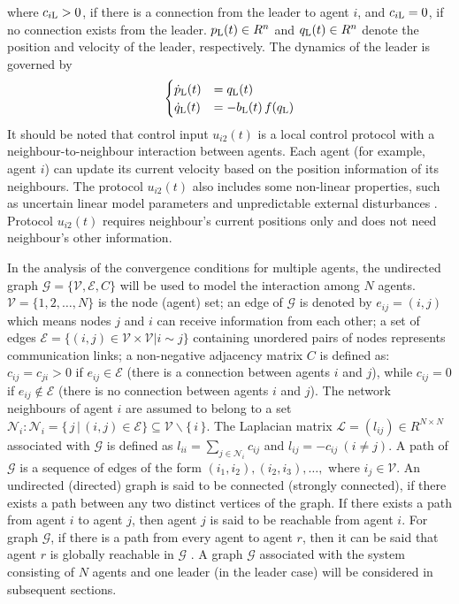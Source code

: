 \documentclass{cta-author}
\begin{document}
where $c_{i{\rm L}}>0$, if there is a connection from the leader to agent
$i$, and $c_{i{\rm L}}=0$, if no connection exists from the leader.
$p_{\rm L}(t)\in R^{n}$ and $q_{\rm L}(t)\in R^{n}$ denote the position and
velocity of the leader, respectively. The dynamics of the leader is
governed by
\begin{equation}\label{eq4}
\begin{cases}
\dot{p}_{\rm L}(t) &= q_{\rm L}(t)\\
\dot{q}_{\rm L}(t)&=-b_{\rm L}(t)\,f(q_{\rm L})
\end{cases}
\end{equation}
It should be noted that control input $u_{i2}(t)$
is a local control protocol with a neighbour-to-neighbour interaction
between agents. Each agent (for example, agent $i$) can update its current velocity based
on the position information of its neighbours. The protocol
$u_{i2}(t)$ also includes some non-linear properties, such as
uncertain linear model parameters and unpredictable external
disturbances . Protocol
$u_{i2}(t)$  requires neighbour's current positions only and does not need
neighbour's other information.

In the analysis of the convergence conditions for multiple agents,
the undirected graph  $\mathcal{G}=\{\mathcal{V},\mathcal{E}, C\}$ will be used to model the interaction among
$N$ agents. $\mathcal{V}=\{1,2,\ldots,N\}$ is the node (agent) set;
an edge of $\mathcal{G}$ is denoted by $e_{ij} = (i, j)$ which means
nodes $j$ and $i$ can receive information from each
other; a set of edges $\mathcal{E}=\{(i, j)\in \mathcal{V}\times\mathcal{V}|i\sim j\}$
containing unordered pairs of nodes represents communication links;
a non-negative adjacency matrix $C$ is defined as: $c_{ij}=c_{j i}>0$
if $e_{i j}\in \mathcal{E}$ (there is a connection between agents $i$ and $j$), while $c_{ij}=0$ if $e_{ij}\notin
\mathcal{E}$ (there is no connection between agents $i$ and $j$). The network neighbours of agent $i$ are assumed to
belong to a set $\mathcal{N}_{i}: \mathcal{N}_{i}=\{\,j\, |\,(i,
j)\in \mathcal{E}\}\subseteq\mathcal{V}\backslash \{\,i\,\}$. The
Laplacian matrix $\mathcal{L}=(l_{i j})\in R^{N\times N}$
associated with $\mathcal{G}$ is defined as $l_{i
i}=\sum_{j\in \mathcal{N}_{i}}c_{i j}$ and $l_{i j}=-c_{i
j}\ (i\neq j)$. A path of $\mathcal{G}$ is a sequence of edges of the
form $(i_{1}, i_{2}),(i_{2}, i_{3}),\ldots,$ where
$i_{j}\in\mathcal{V}$. An undirected (directed) graph is said to be
connected (strongly connected), if there exists a path between any
two distinct vertices of the graph. If there exists a path from agent $i$ to agent $j$, then agent $j$
is said to be reachable from agent $i$. For graph $\mathcal{G}$, if there is a path from every agent to agent $r$, then it can be said
that agent $r$ is globally reachable in $\mathcal{G}$ . A
graph $\mathcal{G}$ associated with the system consisting of $N$
agents and one leader (in the leader case) will be considered in
subsequent sections.
\end{document}
